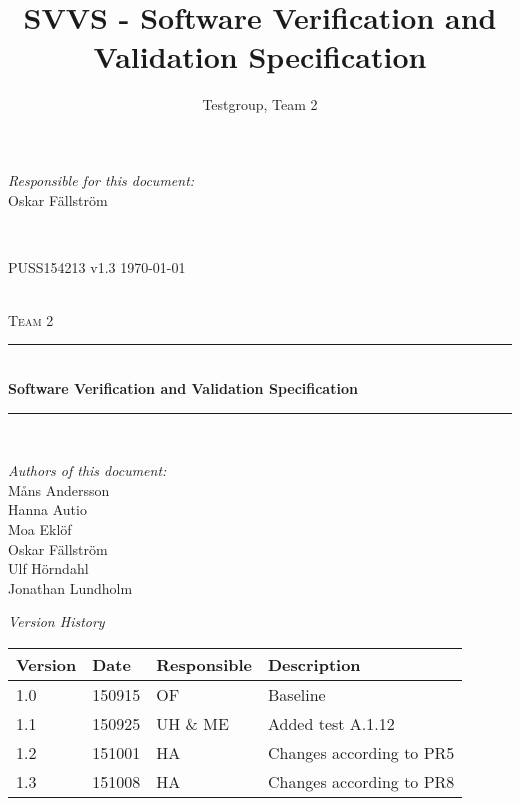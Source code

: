 \documentclass[a4paper]{article}
\title{SVVS - Software Verification and Validation Specification}
\author{Testgroup, Team 2}
\begin{document}
\begin{titlepage}
\newcommand{\HRule}{\rule{\linewidth}{0.5mm}}

\begin{minipage}{0.5\textwidth}
\begin{flushleft} %
\textit{Responsible for this document:}\\
Oskar Fällström %
\end{flushleft}
\end{minipage}
~
\begin{minipage}{0.4\textwidth}
\begin{flushright}
PUSS154213 v1.3 %
\today
\end{flushright}
\end{minipage}\\[3cm]

\centering
\textsc{\LARGE Team 2}\\[0.5cm]

\HRule \\[0.4cm]
{ \huge \bfseries Software Verification and Validation  Specification}\\[0.4cm] %
\HRule \\[1.5cm]

\vfill
\begin{flushleft}
\textit{Authors of this document:}\\
Måns Andersson \\
Hanna Autio \\
Moa Eklöf \\
Oskar Fällström \\
Ulf Hörndahl \\
Jonathan Lundholm
\end{flushleft}


\end{titlepage}

\begin{center}
\textit{\large Version History}

    \begin{tabular}{ | l | l | l | p{5cm} |}
    \hline
    \textbf{Version}	& \textbf{Date}		& \textbf{Responsible}		& \textbf{Description}					\\ \hline
    1.0					& 150915 			& OF						& Baseline								\\ \hline
    1.1					& 150925			& UH \& ME					& Added test A.1.12 					\\ \hline
    1.2					& 151001			& HA						& Changes according to PR5				\\ \hline
    1.3					& 151008			& HA						& Changes according to PR8				\\ \hline
    \end{tabular}
\end{center}
\end{document}
